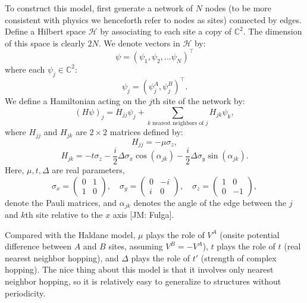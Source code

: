 \documentclass[a4paper]{article}
\newcommand{\jm}[1]{{\color{red} [JM: #1]}}
\begin{document}
To construct this model, first generate a network of $N$ nodes (to be more consistent with physics we henceforth refer to nodes as sites) connected by edges. Define a Hilbert space $\mathcal{H}$ by associating to each site a copy of $\mathbb{C}^2$. The dimension of this space is clearly $2 N$. We denote vectors in $\mathcal{H}$ by:
\begin{equation}
	\psi = \left( \psi_1, \psi_2, ... \psi_N \right)^\top
\end{equation}
where each $\psi_j \in \mathbb{C}^2$:
\begin{equation}
	\psi_j = \left( \psi_j^A , \psi_j^B \right)^\top.
\end{equation}
We define a Hamiltonian acting on the $j$th site of the network by:
\begin{equation}
	( H \psi )_j = H_{jj} \psi_j + \sum_{ k \text{ nearest neighbors of } j } H_{jk} \psi_k,
\end{equation}
where $H_{jj}$ and $H_{jk}$ are $2 \times 2$ matrices defined by:
\begin{equation}
	H_{jj} = - \mu \sigma_z,
\end{equation}
\begin{equation}
	H_{jk} = - t \sigma_z - \frac{ i }{ 2 } \Delta \sigma_x \cos( \alpha_{jk} ) - \frac{ i }{ 2 } \Delta \sigma_y \sin( \alpha_{jk} ).
\end{equation}
Here, $\mu, t, \Delta$ are real parameters,
\begin{equation}
	\sigma_x = \begin{pmatrix} 0 & 1 \\ 1 & 0 \end{pmatrix}, \quad \sigma_y = \begin{pmatrix} 0 & - i \\ i & 0 \end{pmatrix}, \quad \sigma_z = \begin{pmatrix} 1 & 0 \\ 0 & -1 \end{pmatrix},
\end{equation}
denote the Pauli matrices, and $\alpha_{jk}$ denotes the angle of the edge between the $j$ and $k$th site relative to the $x$ axis \jm{Fulga}.%

Compared with the Haldane model, $\mu$ plays the role of $V^A$ (onsite potential difference between $A$ and $B$ sites, assuming $V^B = - V^A$), $t$ plays the role of $t$ (real nearest neighbor hopping), and $\Delta$ plays the role of $t'$ (strength of complex hopping). The nice thing about this model is that it involves only nearest neighbor hopping, so it is relatively easy to generalize to structures without periodicity.
\end{document}
